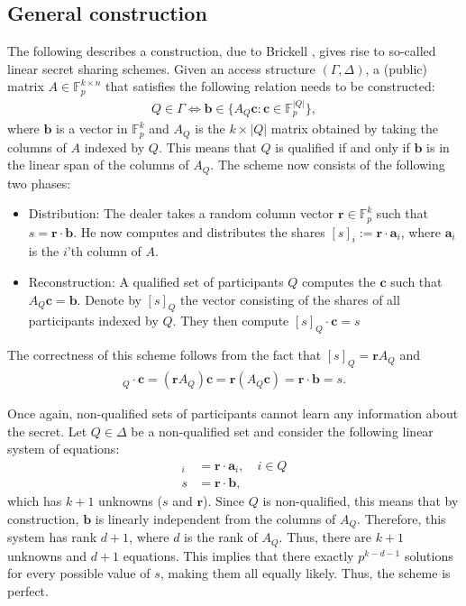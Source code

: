 \documentclass[11pt]{article}
\newcommand{\F}{\mathbb{F}}
\newcommand{\bfa}{\mathbf{a}}
\newcommand{\bfb}{\mathbf{b}}
\newcommand{\bfc}{\mathbf{c}}
\newcommand{\bfr}{\mathbf{r}}
\begin{document}
\subsection*{General construction}
The following describes a construction, due to Brickell \cite{Bric90}, gives rise to so-called linear secret sharing schemes. Given an access structure $(\Gamma,\Delta)$, a (public) matrix $A\in\F_p^{k\times n}$ that satisfies the following relation needs to be constructed:
  \begin{align*}
  Q \in \Gamma \Leftrightarrow \bfb \in \{A_Q \bfc: \bfc \in \F_p^{|Q|}\},
  \end{align*}
where $\bfb$ is a vector in $\F_p^k$ and $A_Q$ is the $k\times |Q|$ matrix obtained by taking the columns of $A$ indexed by $Q$. This means that $Q$ is qualified if and only if $\bfb$ is in the linear span of the columns of $A_Q$. The scheme now consists of the following two phases:
\begin{itemize}
  \item{Distribution: The dealer takes a random column vector $\bfr \in \F_p^k$ such that $s = \bfr\cdot\bfb$. He now computes and distributes the shares $[s]_i := \bfr\cdot\bfa_i$, where $\bfa_i$ is the $i$'th column of $A$.}
  \item{Reconstruction: A qualified set of participants $Q$ computes the $\bfc$ such that $A_Q\bfc = \bfb$. Denote by $[s]_Q$ the vector consisting of the shares of all participants indexed by $Q$. They then compute $[s]_Q\cdot \bfc = s$}
\end{itemize}
The correctness of this scheme follows from the fact that $[s]_Q = \bfr A_Q$ and
  \begin{align*}
  [s]_Q\cdot \bfc = (\bfr A_Q) \bfc = \bfr (A_Q \bfc) = \bfr \cdot \bfb = s.
  \end{align*}

Once again, non-qualified sets of participants cannot learn any information about the secret. Let $Q\in\Delta$ be a non-qualified set and consider the following linear system of equations:
  \begin{align*}
  [s]_i &= \bfr\cdot\bfa_i,\quad i\in Q\\
  s &= \bfr\cdot\bfb,
  \end{align*}
which has $k+1$ unknowns ($s$ and $\bfr$). Since $Q$ is non-qualified, this means that by construction, $\bfb$ is linearly independent from the columns of $A_Q$. Therefore, this system has rank $d + 1$, where $d$ is the rank of $A_Q$. Thus, there are $k+1$ unknowns and $d+1$ equations. This implies that there exactly $p^{k-d-1}$ solutions for every possible value of $s$, making them all equally likely. Thus, the scheme is perfect. 
\end{document}
